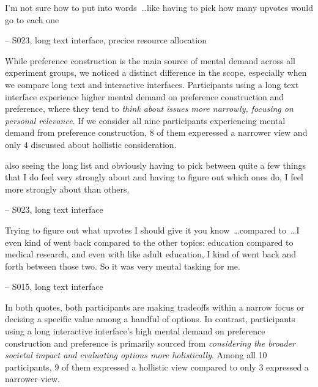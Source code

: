 \begin{displayquote}
I'm not sure how to put into words~\ldots like having to pick how many upvotes would go to each one
    
\noindent \hfill -- S023, long text interface, precice resource allocation
\end{displayquote}

While preference construction is the main source of mental demand across all experiment groups, we noticed a distinct difference in the scope, especially when we compare long text and interactive interfaces. Participants using a long text interface experience higher mental demand on preference construction and preference, where they tend to \textit{think about issues more narrowly, focusing on personal relevance}. If we consider all nine participants experiencing mental demand from preference construction, $8$ of them experessed a narrower view and only $4$ discussed about hollistic consideration.

\begin{displayquote}
\bracketellipsis also seeing the long list and obviously having to pick between quite a few things that I do feel very strongly about and having to figure out which ones do, I feel more strongly about than others.
    
\noindent \hfill -- S023, long text interface
\end{displayquote}

\begin{displayquote}
Trying to figure out what upvotes I should give it you know~\ldots compared to~\ldots I even kind of went back compared to the other topics: education compared to medical research, and even with like adult education, I kind of went back and forth between those two. \bracketellipsis So it was very mental tasking for me.

\noindent \hfill -- S015, long text interface
\end{displayquote}
In both quotes, both participants are making tradeoffs within a narrow focus or decising a specific value among a handful of options. In contrast, participants using a long interactive interface's high mental demand on preference construction and preference is primarily sourced from \textit{considering the broader societal impact and evaluating options more holistically}. Among all 10 participants, $9$ of them expressed a hollistic view compared to only $3$ expressed a narrower view.

